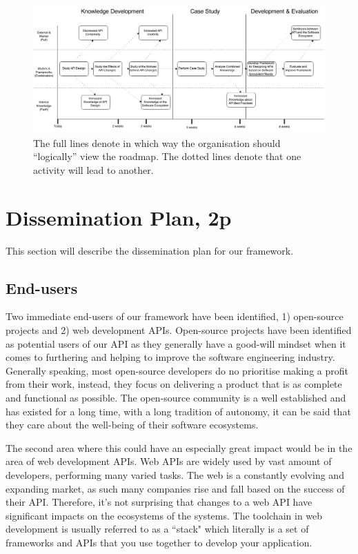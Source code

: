 \documentclass{article}
\begin{document}
\begin{figure}
\centering
\includegraphics[width=220mm]{RoadMap.png}
\caption{The full lines denote in which way the organisation should ``logically'' view the roadmap. The dotted lines denote that one activity will lead to another. }
\label{fig:roadmap}
\end{figure}

\section{Dissemination Plan, 2p}
This section will describe the dissemination plan for our framework. 

\subsection{End-users}

Two immediate end-users of our framework have been identified, 1) open-source projects and 2) web development APIs. Open-source projects have been identified as potential users of our API as they generally have a good-will mindset when it comes to furthering and helping to improve the software engineering industry. Generally speaking, most open-source developers do no prioritise making a profit from their work, instead, they focus on delivering a product that is as complete and functional as possible. The open-source community is a well established and has existed for a long time, with a long tradition of autonomy, it can be said that they care about the well-being of their software ecosystems. 

The second area where this could have an especially great impact would be in the area of web development APIs. Web APIs are widely used by vast amount of developers, performing many varied tasks. The web is a constantly evolving and expanding market, as such many companies rise and fall based on the success of their API. Therefore, it's not surprising that changes to a web API have significant impacts on the ecosystems of the systems. The toolchain in web development is usually referred to as a ``stack" which literally is a set of frameworks and APIs that you use together to develop your application.
\end{document}
